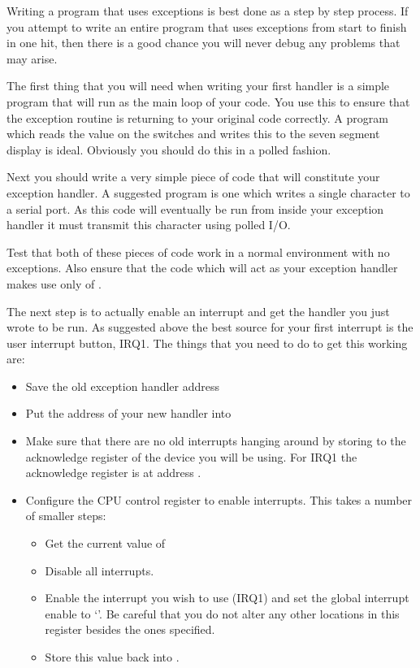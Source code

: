 Writing a program that uses exceptions is best done as a step by step
process. If you attempt to write an entire program that uses exceptions
from start to finish in one hit, then there is a good chance you will never
debug any problems that may arise.

The first thing that you will need when writing your first handler is a
simple program that will run as the main loop of your code. You use this to
ensure that the exception routine is returning to your original code
correctly. A program which reads the value on the switches and writes this
to the seven segment display is ideal. Obviously you should do this in a
polled fashion.

Next you should write a very simple piece of code that will constitute
your exception handler. A suggested program is one which writes a
single character to a serial port. As this code will eventually be run
from inside your exception handler it must transmit this character
using polled I/O.

Test that both of these pieces of code work in a normal environment with no
exceptions. Also ensure that the code which will act as your exception
handler makes use only of .

The next step is to actually enable an interrupt and get the handler
you just wrote to be run. As suggested above the best source for your
first interrupt is the user interrupt button, IRQ1. The things that
you need to do to get this working are:

\begin{itemize}
\item Save the old exception handler address
\item Put the address of your new handler into 
\item Make sure that there are no old interrupts hanging around by
storing  to the acknowledge register of the device you
will be using. For IRQ1 the acknowledge register is at address
.
\item Configure the CPU control register to enable interrupts. This
takes a number of smaller steps:
\begin{itemize}
\item Get the current value of 
\item Disable all interrupts.
\item Enable the interrupt you wish to use (IRQ1) and set the global
interrupt enable to `'. Be careful that you do not alter any
other locations in this register besides the ones specified.
\item Store this value back into .
\end{itemize}
\end{itemize}


